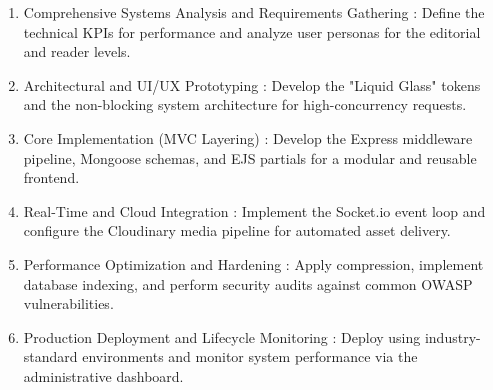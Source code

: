 \documentclass[12pt,a4paper]{report}
\begin{document}
\begin{enumerate}
\item Comprehensive Systems Analysis and Requirements Gathering :
Define the technical KPIs for performance and analyze user personas for the editorial and reader levels.

\item Architectural and UI/UX Prototyping :
Develop the "Liquid Glass" tokens and the non-blocking system architecture for high-concurrency requests.

\item Core Implementation (MVC Layering) :
Develop the Express middleware pipeline, Mongoose schemas, and EJS partials for a modular and reusable frontend.

\item Real-Time and Cloud Integration :
Implement the Socket.io event loop and configure the Cloudinary media pipeline for automated asset delivery.

\item Performance Optimization and Hardening :
Apply compression, implement database indexing, and perform security audits against common OWASP vulnerabilities.

\item Production Deployment and Lifecycle Monitoring :
Deploy using industry-standard environments and monitor system performance via the administrative dashboard.
\end{enumerate}
\end{document}
